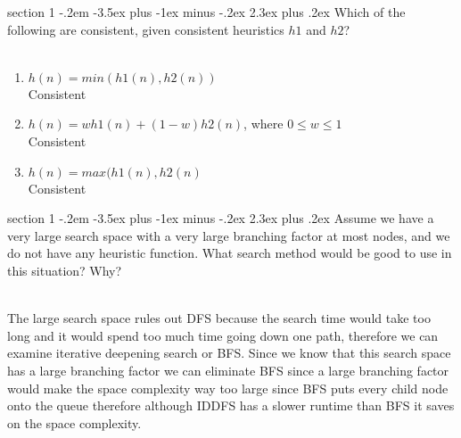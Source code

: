 \documentclass[12pt]{article}
\makeatletter
\newenvironment{problem}{\@startsection
  {section}
  {1}
  {-.2em}
  {-3.5ex plus -1ex minus -.2ex}
  {2.3ex plus .2ex}
  {
    \large\bf\noindent{Problem }
  }
}
\makeatother
\begin{document}
\begin{problem}{}
	\color{gray}
Which of the following are consistent, given consistent heuristics $h1$
and $h2$?\\\\
	\color{black}
\begin{enumerate}
       \item $h(n) = min(h1(n), h2(n))$ \\
         Consistent
         \item $h(n) = w h1(n) + (1 − w)h2(n)$, where $0 \leq w \leq
           1$\\
           Consistent
           \item  $h(n) = max(h1(n), h2(n)$\\
           Consistent
    
\end{enumerate}
\end{problem}

\begin{problem}{}
  \color{gray}
Assume we have a very large search space with a very large branching factor at most nodes, and we
do not have any heuristic function. What search method would be good
to use in this situation? Why?\\\\
\color{black}

The large search space rules out DFS because the search time would
take too long and it would spend too much time going down one path, therefore we can examine iterative deepening search or
BFS.  Since we know that this search space has a large branching
factor we can eliminate BFS since a large branching factor would make
the space complexity way too large since BFS puts every child node
onto the queue therefore although IDDFS has a slower runtime than BFS
it saves on the space complexity.

\end{problem}
\end{document}
